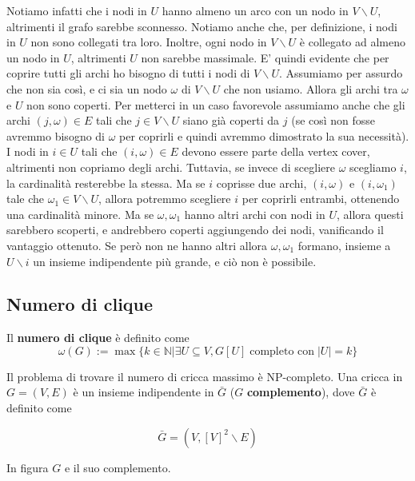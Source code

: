 \documentclass[12pt]{report}
\begin{document}
\noindent 
Notiamo infatti che i nodi in $U$ hanno almeno un arco con un nodo in $V\backslash U$, altrimenti il grafo sarebbe sconnesso. Notiamo anche che, per definizione, i nodi in $U$ non sono collegati tra loro. Inoltre, ogni nodo in $V\backslash U$ è collegato ad almeno un nodo in $U$, altrimenti $U$ non sarebbe massimale. E' quindi evidente che per coprire tutti gli archi ho bisogno  di tutti i nodi di $V\backslash U$. Assumiamo per assurdo che non sia così, e ci sia un nodo $\omega$ di $V \backslash U$ che non usiamo. Allora gli archi tra $\omega$ e $U$ non sono coperti. Per metterci in un caso favorevole assumiamo anche che gli archi $(j,\omega) \in E$ tali che $j \in V \backslash U $ siano già coperti da $j$ (se così non fosse avremmo bisogno di $\omega$ per coprirli e quindi avremmo dimostrato la sua necessità). I nodi in $i \in U$ tali che $(i,\omega) \in E$ devono essere parte della vertex cover, altrimenti non copriamo degli archi. Tuttavia, se invece di scegliere $\omega$ scegliamo $i$, la cardinalità resterebbe la stessa. Ma se $i$ coprisse due archi, $(i,\omega)$ e $(i,\omega_1)$ tale che $\omega_1 \in V \backslash U$, allora potremmo scegliere $i$ per coprirli entrambi, ottenendo una cardinalità minore. Ma se $\omega,\omega_1$ hanno altri archi con nodi in $U$, allora questi sarebbero scoperti, e andrebbero coperti aggiungendo dei nodi, vanificando il vantaggio ottenuto. Se però non ne hanno altri allora $\omega,\omega_1$ formano, insieme a $U \backslash i$ un insieme indipendente più grande, e ciò non è possibile.

\subsection{Numero di clique}

\begin{defi}
    Il \textbf{numero di clique} è definito come 
    $$
        \omega(G) := \max\{k \in \mathbb{N} | \exists U \subseteq V, G[U] \; \text{completo con} \; |U| = k\}$$
\end{defi}

\noindent 
Il problema di trovare il numero di cricca massimo è NP-completo. Una cricca in $G =(V,E)$ è un insieme indipendente in $\bar G$ ($G$ \textbf{complemento}), dove $\bar G$ è definito come 

$$\bar G = (V , [V]^2 \backslash E)$$

\begin{exmp} In figura $G$ e il suo complemento.
\end{exmp}
\end{document}
